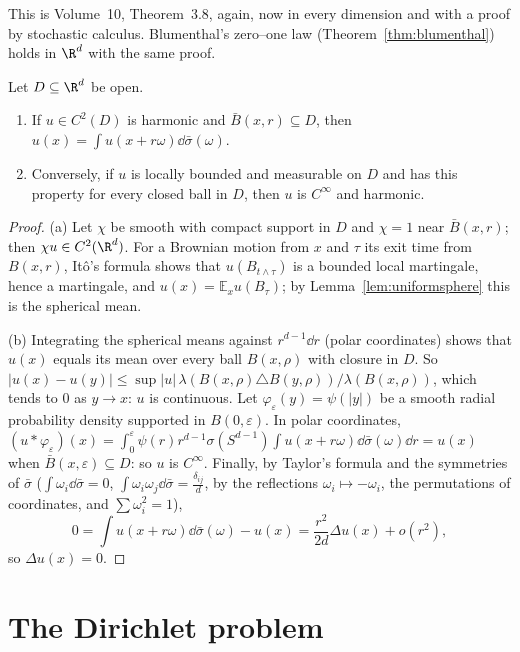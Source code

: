 This is Volume~10, Theorem~3.8, again, now in every dimension and with a proof by stochastic calculus. Blumenthal's zero--one law (Theorem~\ref{thm:blumenthal}) holds in $\R^d$ with the same proof.

\begin{lemma}\label{lem:meanvalue}
Let $D\subseteq\R^d$ be open.
\begin{enumerate}[label=(\alph*)]
\item If $u\in C^2(D)$ is harmonic and $\bar B(x,r)\subseteq D$, then $u(x)=\int u(x+r\omega)\dd\bar\sigma(\omega)$.
\item Conversely, if $u$ is locally bounded and measurable on $D$ and has this property for every closed ball in $D$, then $u$ is $C^\infty$ and harmonic.
\end{enumerate}
\end{lemma}

\begin{proof}
(a) Let $\chi$ be smooth with compact support in $D$ and $\chi=1$ near $\bar B(x,r)$; then $\chi u\in C^2(\R^d)$. For a Brownian motion from $x$ and $\tau$ its exit time from $B(x,r)$, It\^o's formula shows that $u(B_{t\wedge\tau})$
is a bounded local martingale, hence a martingale, and $u(x)=\mathbb E_xu(B_\tau)$; by Lemma~\ref{lem:uniformsphere} this is the spherical mean.

(b) Integrating the spherical means against $r^{d-1}\dd r$ (polar coordinates) shows that $u(x)$ equals its mean over every ball $B(x,\rho)$ with closure in $D$. So $|u(x)-u(y)|\le\sup|u|\,\lambda(B(x,\rho)\triangle B(y,\rho))/\lambda(B(x,\rho))$,
which tends to $0$ as $y\to x$: $u$ is continuous. Let $\varphi_\varepsilon(y)=\psi(|y|)$ be a smooth radial probability density supported in $B(0,\varepsilon)$. In polar coordinates,
$(u*\varphi_\varepsilon)(x)=\int_0^\varepsilon\psi(r)r^{d-1}\sigma(S^{d-1})\int u(x+r\omega)\dd\bar\sigma(\omega)\dd r=u(x)$ when $\bar B(x,\varepsilon)\subseteq D$: so $u$ is $C^\infty$. Finally, by Taylor's formula and the
symmetries of $\bar\sigma$ ($\int\omega_i\dd\bar\sigma=0$, $\int\omega_i\omega_j\dd\bar\sigma=\frac{\delta_{ij}}d$, by the reflections $\omega_i\mapsto-\omega_i$, the permutations of coordinates, and $\sum\omega_i^2=1$),
\[
0=\int u(x+r\omega)\dd\bar\sigma(\omega)-u(x)=\frac{r^2}{2d}\Delta u(x)+o(r^2),
\]
so $\Delta u(x)=0$.
\end{proof}

\section{The Dirichlet problem}

